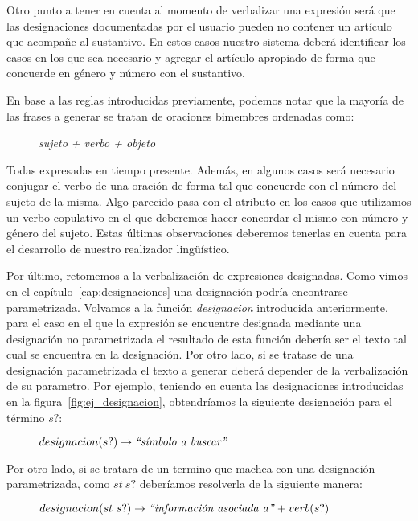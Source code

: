 Otro punto a tener en cuenta al momento de verbalizar una expresión será que las designaciones documentadas por el usuario pueden no contener un artículo que acompañe al sustantivo. En estos casos nuestro sistema deberá identificar los casos en los que sea necesario y agregar el artículo apropiado de forma que concuerde en género y número con el sustantivo. 

En base a las reglas introducidas previamente, podemos notar que la mayoría de las frases a generar se tratan de oraciones bimembres ordenadas como: 
\begin{figure}[H]
\center
\emph{sujeto + verbo + objeto}
\end{figure}

\noindent
Todas expresadas en tiempo presente. Además, en algunos casos será necesario conjugar el verbo de una oración de forma tal que concuerde con el número del sujeto de la misma. Algo parecido pasa con el atributo en los casos que utilizamos un verbo copulativo en el que deberemos hacer concordar el mismo con número y género del sujeto. Estas últimas observaciones deberemos tenerlas en cuenta para el desarrollo de nuestro realizador lingüístico.

Por último, retomemos a la verbalización de expresiones designadas. Como vimos en el capítulo~\ref{cap:designaciones} una designación podría encontrarse parametrizada. Volvamos a la función \emph{designacion} introducida anteriormente, para el caso en el que la expresión se encuentre designada mediante una designación no parametrizada el resultado de esta función debería ser el texto tal cual se encuentra en la designación. Por otro lado, si se tratase de una designación parametrizada el texto a generar deberá depender de la verbalización de su parametro. Por ejemplo, teniendo en cuenta las designaciones introducidas en la figura~\ref{fig:ej_designacion}, obtendríamos la siguiente designación para el término $s?$:

\begin{figure}[H]
\center
$designacion(s?) \rightarrow \text{\emph{``símbolo a buscar''}}$
\end{figure}

\noindent
Por otro lado, si se tratara de un termino que machea con una designación parametrizada, como $st~s?$ deberíamos resolverla de la siguiente manera: 

\begin{figure}[H]
\center
$designacion(st~s?) \rightarrow \text{\emph{``información asociada a''}} + verb(s?)$
\end{figure}



